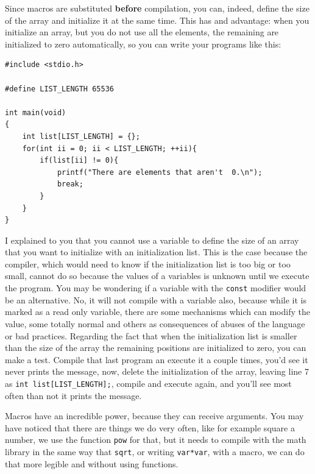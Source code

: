 \documentclass[a4paper]{article}
\begin{document}
Since macros are substituted \textbf{before} compilation, you can, indeed,
define the size of the array and initialize it at the same time. This has and
advantage: when you initialize an array, but you do not use all the elements,
the remaining are initialized to zero automatically, so you can write your
programs like this:

\noindent
\begin{minipage}[H]{\linewidth}
\mbox{}
\begin{lstlisting}[style=C,
caption={Macro use with arrays},
label={lst:defineArray}]
#include <stdio.h>

#define LIST_LENGTH 65536

int main(void)
{
    int list[LIST_LENGTH] = {};
    for(int ii = 0; ii < LIST_LENGTH; ++ii){
        if(list[ii] != 0){
            printf("There are elements that aren't  0.\n");
            break;
        }
    }
}
\end{lstlisting}
\end{minipage}

I explained to you that you cannot use a variable to define the size of an array
that you want to initialize with an initialization list. This is the case
because the compiler, which would need to know if the initialization list is too
big or too small, cannot do so because the values of a variables is unknown
until we execute the program. You may be wondering if a variable with the
\verb!const! modifier would be an alternative. No, it will not compile with a
variable also, because while it is marked as a read only variable, there are
some mechanisms which can modify the value, some totally normal and others as
consequences of abuses of the language or bad practices. Regarding the fact
that when the initialization list is smaller than the size of the array the
remaining positions are initialized to zero, you can make a test. Compile that
last program an execute it a couple times, you'd see it never prints the
message, now, delete the initialization of the array, leaving line 7 as
\verb!int list[LIST_LENGTH];!, compile and execute again, and you'll see most
often than not it prints the message.

Macros have an incredible power, because they can receive arguments. You may
have noticed that there are things we do very often, like for example square a
number, we use the function \verb!pow! for that, but it needs to compile with
the math library in the same way that \verb!sqrt!, or writing \verb!var*var!,
with a macro, we can do that more legible and without using functions.
\end{document}
